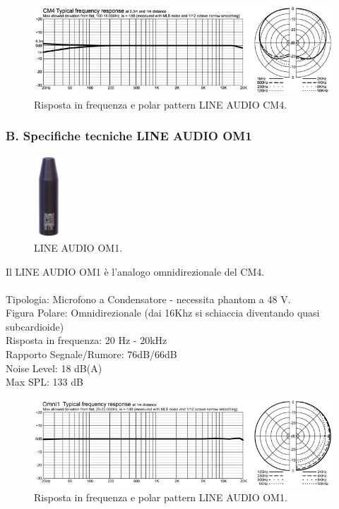 \documentclass{article}
\begin{document}
    \begin{figure}[H]
        \includegraphics[width=1\textwidth]{images/CM4PLOT.jpg}
        \caption{\label{fig3}Risposta in frequenza e polar pattern LINE AUDIO CM4.}
    \end{figure}
\endsubsubsection

\subsubsection{B. Specifiche tecniche LINE AUDIO OM1}
    \begin{figure}[H]
        \centering
        \includegraphics[width=0.1\textwidth]{images/Omni1.jpg}
        \caption{\label{fig4}LINE AUDIO OM1.}
    \end{figure}
    
    Il LINE AUDIO OM1 è l'analogo omnidirezionale del CM4.\\\\
    Tipologia: Microfono a Condensatore - necessita phantom a 48 V. \\
    Figura Polare: Omnidirezionale (dai 16Khz si schiaccia diventando quasi subcardioide)\\
    Risposta in frequenza: 20 Hz - 20kHz\\
    Rapporto Segnale/Rumore: 76dB/66dB\\
    Noise Level: 18 dB(A)\\
    Max SPL: 133 dB
    
    \begin{figure}[H]
        \includegraphics[width=1\textwidth]{images/Omni1plot.png}
        \caption{\label{fig5}Risposta in frequenza e polar pattern LINE AUDIO OM1.}
    \end{figure}
\endsubsubsection
\end{document}
